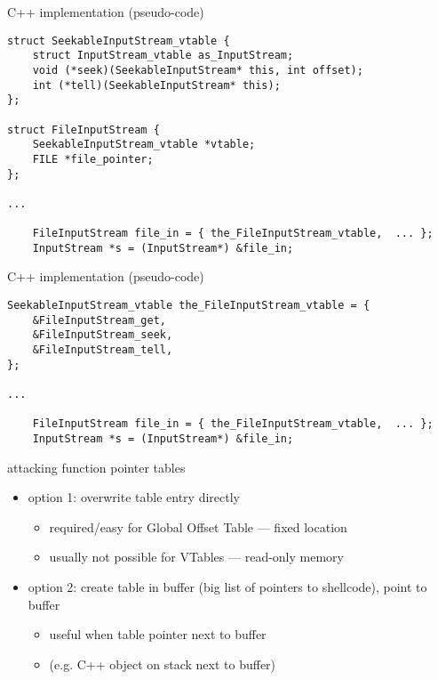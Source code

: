 \begin{frame}[fragile,label=CPPImplB]{C++ implementation (pseudo-code)}
\lstset{
    language=C,style=smaller,
}
\vspace{-.5cm}
\begin{lstlisting}
struct SeekableInputStream_vtable {
    struct InputStream_vtable as_InputStream;
    void (*seek)(SeekableInputStream* this, int offset);
    int (*tell)(SeekableInputStream* this);
};

struct FileInputStream {
    SeekableInputStream_vtable *vtable;
    FILE *file_pointer;
};

...

    FileInputStream file_in = { the_FileInputStream_vtable,  ... };
    InputStream *s = (InputStream*) &file_in;
\end{lstlisting}
\end{frame}

\begin{frame}[fragile,label=CPPImplC]{C++ implementation (pseudo-code)}
\lstset{
    language=C,style=smaller,
}
\vspace{-.5cm}
\begin{lstlisting}
SeekableInputStream_vtable the_FileInputStream_vtable = {
    &FileInputStream_get,
    &FileInputStream_seek,
    &FileInputStream_tell,
};

...

    FileInputStream file_in = { the_FileInputStream_vtable,  ... };
    InputStream *s = (InputStream*) &file_in;
\end{lstlisting}
\end{frame}



\begin{frame}{attacking function pointer tables}
\begin{itemize}
\item option 1: overwrite table entry directly  
    \begin{itemize}
    \item required/easy for Global Offset Table --- fixed location
    \item usually not possible for VTables --- read-only memory
    \end{itemize}
\item option 2: create table in buffer (big list of pointers to shellcode), point to buffer
    \begin{itemize}
    \item useful when table pointer next to buffer
    \item (e.g. C++ object on stack next to buffer)
    \end{itemize}
\end{itemize}
\end{frame}

